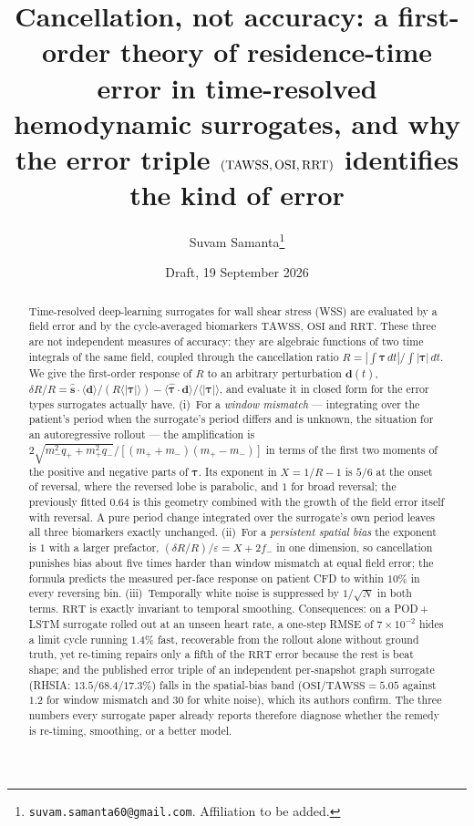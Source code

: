 \documentclass[11pt,a4paper]{article}
\title{Cancellation, not accuracy: a first-order theory of residence-time
error in time-resolved hemodynamic surrogates, and why the error triple
$(\TAWSS,\OSI,\RRT)$ identifies the kind of error}
\author{Suvam Samanta\thanks{\texttt{suvam.samanta60@gmail.com}. Affiliation to be added.}}
\date{Draft, 19 September 2026}
\newcommand{\TAWSS}{\mathrm{TAWSS}}
\newcommand{\OSI}{\mathrm{OSI}}
\newcommand{\RRT}{\mathrm{RRT}}
\newcommand{\eps}{\varepsilon}
\begin{document}
\maketitle

\begin{abstract}
Time-resolved deep-learning surrogates for wall shear stress (WSS) are
evaluated by a field error and by the cycle-averaged biomarkers $\TAWSS$,
$\OSI$ and $\RRT$. These three are not independent measures of accuracy:
they are algebraic functions of two time integrals of the same field,
coupled through the cancellation ratio
$R=|\int\boldsymbol\tau\,dt|/\int|\boldsymbol\tau|\,dt$. We give the
first-order response of $R$ to an arbitrary perturbation
$\mathbf d(t)$,
$\delta R/R=\hat{\mathbf s}\cdot\langle\mathbf d\rangle/(R\langle|\boldsymbol\tau|\rangle)
-\langle\hat{\boldsymbol\tau}\cdot\mathbf d\rangle/\langle|\boldsymbol\tau|\rangle$,
and evaluate it in closed form for the error types surrogates actually have.
(i)~For a \emph{window mismatch} --- integrating over the patient's period
when the surrogate's period differs and is unknown, the situation for an
autoregressive rollout --- the amplification is
$2\sqrt{m_-^2q_++m_+^2q_-}/[(m_++m_-)(m_+-m_-)]$ in terms of the first two
moments of the positive and negative parts of $\boldsymbol\tau$. Its exponent
in $X=1/R-1$ is $5/6$ at the onset of reversal, where the reversed lobe is
parabolic, and $1$ for broad reversal; the previously fitted $0.64$ is this
geometry combined with the growth of the field error itself with reversal.
A pure period change integrated over the surrogate's own period leaves all
three biomarkers exactly unchanged. (ii)~For a \emph{persistent spatial bias}
the exponent is $1$ with a larger prefactor, $(\delta R/R)/\eps=X+2f_-$ in
one dimension, so cancellation punishes bias about five times harder than
window mismatch at equal field error; the formula predicts the measured
per-face response on patient CFD to within $10\%$ in every reversing bin.
(iii)~Temporally white noise is suppressed by $1/\sqrt N$ in both terms.
$\RRT$ is exactly invariant to temporal smoothing. Consequences: on a
POD\,+\,LSTM surrogate rolled out at an unseen heart rate, a one-step RMSE of
$7\times10^{-2}$ hides a limit cycle running $1.4\%$ fast, recoverable from
the rollout alone without ground truth, yet re-timing repairs only a fifth of
the $\RRT$ error because the rest is beat shape; and the published error
triple of an independent per-snapshot graph surrogate (RHSIA:
$13.5/68.4/17.3\%$) falls in the spatial-bias band
($\OSI/\TAWSS=5.05$ against $1.2$ for window mismatch and $30$ for white
noise), which its authors confirm. The three numbers every surrogate paper
already reports therefore diagnose whether the remedy is re-timing,
smoothing, or a better model.
\end{abstract}
\end{document}
